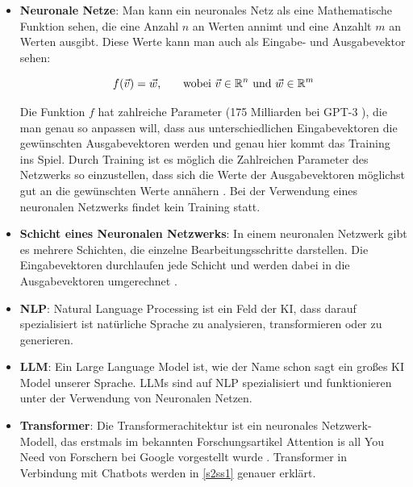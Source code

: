 	\begin{itemize}
		\item \textbf{Neuronale Netze}: Man kann ein neuronales Netz als eine Mathematische Funktion sehen,
		die eine Anzahl $n$ an Werten annimt und eine Anzahlt $m$ an Werten ausgibt. Diese Werte kann man auch als Eingabe-
		und Ausgabevektor sehen: 		
		
		\begin{equation}\label{nueral_network_function}	
			f(\vec{v}) = \vec{w}\textnormal{,\qquad wobei } \vec{v} \in \mathbb{R}^n \textnormal{ und } \vec{w} \in \mathbb{R}^m
		\end{equation}  
		\vspace{0.0cm}
		
		Die Funktion $f$ hat zahlreiche Parameter (175 Milliarden bei GPT-3 \cite[S. 8]{openAI2020}), die man genau so 
		anpassen will, dass aus unterschiedlichen Eingabevektoren die gewünschten Ausgabevektoren werden und genau hier kommt 
		das Training ins Spiel. Durch Training ist es möglich die Zahlreichen Parameter des Netzwerks so einzustellen, dass 
		sich die Werte der Ausgabevektoren möglichst gut an die gewünschten Werte annähern \cite[S. 127f]{nielsen2015}. Bei
		der Verwendung eines neuronalen Netzwerks findet kein Training statt.   

		\item \textbf{Schicht eines Neuronalen Netzwerks}: In einem neuronalen Netzwerk gibt es mehrere Schichten, die einzelne
		Bearbeitungsschritte darstellen. Die Eingabevektoren durchlaufen jede Schicht und werden dabei in die Ausgabevektoren
		umgerechnet \cite[S. 4]{nielsen2015}. 
		
		\item \textbf{NLP}: Natural Language Processing ist ein Feld der KI, dass darauf spezialisiert ist natürliche 
		Sprache zu analysieren, transformieren oder zu generieren.  
		
		\item \textbf{LLM}: Ein Large Language Model ist, wie der Name schon sagt ein großes KI Model unserer Sprache.
		LLMs sind auf NLP spezialisiert und funktionieren unter der Verwendung von Neuronalen Netzen.

		\item \textbf{Transformer}: Die Transformerachitektur ist ein neuronales Netzwerk-Modell, das erstmals im 
		bekannten Forschungsartikel \glqq{}Attention is all You Need\grqq{} von Forschern bei Google vorgestellt wurde 
		\cite{vaswani2017}. Transformer in Verbindung mit Chatbots werden in \ref{s2ss1} genauer erklärt.
		

\end{itemize}
